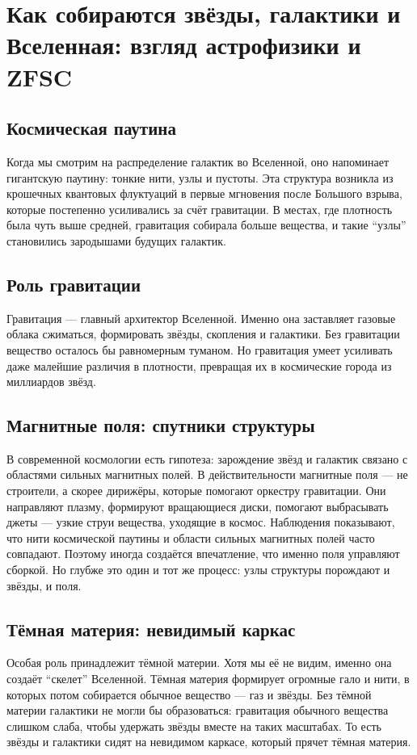 \documentclass[a4paper,12pt]{article}
\begin{document}
\section*{Как собираются звёзды, галактики и Вселенная: взгляд астрофизики и ZFSC}

\subsection*{Космическая паутина}
Когда мы смотрим на распределение галактик во Вселенной, оно напоминает гигантскую паутину: тонкие нити, узлы и пустоты. Эта структура возникла из крошечных квантовых флуктуаций в первые мгновения после Большого взрыва, которые постепенно усиливались за счёт гравитации. В местах, где плотность была чуть выше средней, гравитация собирала больше вещества, и такие ``узлы'' становились зародышами будущих галактик.

\subsection*{Роль гравитации}
Гравитация --- главный архитектор Вселенной. Именно она заставляет газовые облака сжиматься, формировать звёзды, скопления и галактики. Без гравитации вещество осталось бы равномерным туманом. Но гравитация умеет усиливать даже малейшие различия в плотности, превращая их в космические города из миллиардов звёзд.

\subsection*{Магнитные поля: спутники структуры}
В современной космологии есть гипотеза: зарождение звёзд и галактик связано с областями сильных магнитных полей. В действительности магнитные поля --- не строители, а скорее дирижёры, которые помогают оркестру гравитации.  
Они направляют плазму, формируют вращающиеся диски, помогают выбрасывать джеты --- узкие струи вещества, уходящие в космос. Наблюдения показывают, что нити космической паутины и области сильных магнитных полей часто совпадают. Поэтому иногда создаётся впечатление, что именно поля управляют сборкой. Но глубже это один и тот же процесс: узлы структуры порождают и звёзды, и поля.

\subsection*{Тёмная материя: невидимый каркас}
Особая роль принадлежит тёмной материи. Хотя мы её не видим, именно она создаёт ``скелет'' Вселенной. Тёмная материя формирует огромные гало и нити, в которых потом собирается обычное вещество --- газ и звёзды.  
Без тёмной материи галактики не могли бы образоваться: гравитация обычного вещества слишком слаба, чтобы удержать звёзды вместе на таких масштабах. То есть звёзды и галактики сидят на невидимом каркасе, который прячет тёмная материя.
\end{document}
